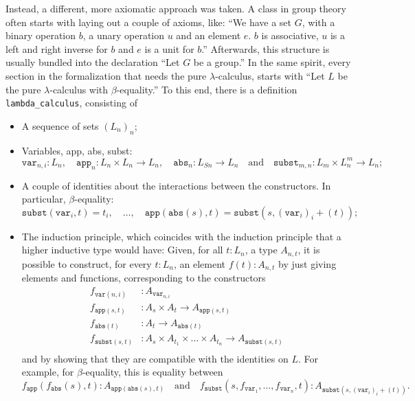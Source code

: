 Instead, a different, more axiomatic approach was taken. A class in group theory often starts with laying out a couple of axioms, like: ``We have a set $ G $, with a binary operation $ b $, a unary operation $ u $ and an element $ e $. $ b $ is associative, $ u $ is a left and right inverse for $ b $ and $ e $ is a unit for $ b $.'' Afterwards, this structure is usually bundled into the declaration ``Let $ G $ be a group.'' In the same spirit, every section in the formalization that needs the pure $ \lambda $-calculus, starts with ``Let $ L $ be the pure $ \lambda $-calculus with $ \beta $-equality.'' To this end, there is a definition \texttt{lambda\_calculus}, consisting of
\begin{itemize}
  \item A sequence of sets $ (L_n)_n $;
  \item Variables, app, abs, subst:
    \[ \mathtt{var}_{n, i} : L_n, \quad \mathtt{app}_n: L_n \times L_n \to L_n, \quad \mathtt{abs}_n : L_{S n} \to L_n \quad \text{and} \quad \mathtt{subst}_{m, n}: L_m \times L_n^m \to L_n; \]
  \item A couple of identities about the interactions between the constructors. In particular, $ \beta $-equality:
    \[
      \mathtt{subst}(\mathtt{var}_i, t) = t_i, \quad
      \dots, \quad
      \mathtt{app}(\mathtt{abs}(s), t) = \mathtt{subst}(s, (\mathtt{var}_i)_i + (t));
    \]
  \item The induction principle, which coincides with the induction principle that a higher inductive type would have: Given, for all $ t : L_n $, a type $ A_{n, t} $, it is possible to construct, for every $ t : L_n $, an element $ f(t) : A_{n, t} $ by just giving elements and functions, corresponding to the constructors
    \begin{align*}
      f_{\mathtt{var}(n, i)} &:A_{\mathtt{var}_{n, i}}\\
      f_{\mathtt{app}(s, t)} &:A_s \times A_t \to A_{\mathtt{app}(s, t)}\\
      f_{\mathtt{abs}(t)} &:A_t \to A_{\mathtt{abs}(t)}\\
      f_{\mathtt{subst}(s, t)} &:A_s \times A_{t_1} \times \dots \times A_{t_n} \to A_{\mathtt{subst}(s, t)}\\
    \end{align*}
    and by showing that they are compatible with the identities on $ L $. For example, for $ \beta $-equality, this is equality between
    \[ f_{\mathtt{app}}(f_{\mathtt{abs}}(s), t): A_{\mathtt{app}(\mathtt{abs}(s), t)} \quad \text{and} \quad f_{\mathtt{subst}}(s, f_{\mathtt{var}_1}, \dots, f_{\mathtt{var}_n}, t): A_{\mathtt{subst}(s, (\mathtt{var}_i)_i + (t))}. \]

\end{itemize}
